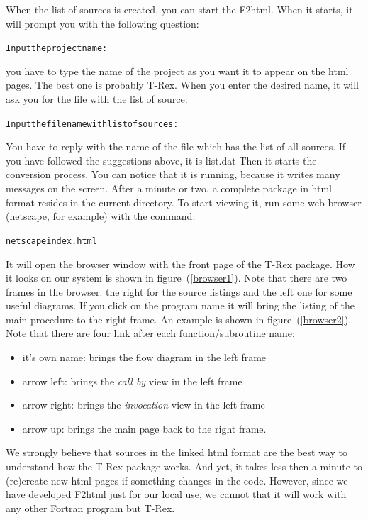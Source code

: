 \documentclass[10pt]{article}
\newcommand*{\tc}{\ttfamily} %
\newcommand*{\tn}{\sffamily} %
\begin{document}
    When the list of sources is created, you can start the
    {\tn F2html}. When it starts, it will prompt you with 
    the following question:
    \small
    \begin{alltt}
    Input the project name:
    \end{alltt}
    \normalsize
    you have to type the name of the project as you want it
    to appear on the html pages. The best one is probably
    {\tc T-Rex}. When you enter the desired name, it will ask
    you for the file with the list of source:
    \small
    \begin{alltt}
    Input the file name with list of sources:
    \end{alltt}
    \normalsize
    You have to reply with the name of the file which has the
    list of all sources. If you have followed the suggestions
    above, it is {\tc list.dat}
    Then it starts the conversion process. You can notice that it
    is running, because it writes many messages on the screen.
    After a minute or two, a complete package in html format
    resides in the current directory. To start viewing it,
    run some web browser (netscape, for example) with the 
    command:
    \small
    \begin{alltt}
    netscape index.html
    \end{alltt}
    \normalsize
    It will open the browser window with the front page of the
    {\tn T-Rex} package. How it looks on our system is shown in
    figure~(\ref{browser1}). Note that there are two frames
    in the browser: the right for the source listings
    and the left one for some useful diagrams.
    If you click on the program name
    it will bring the listing of the main procedure to the
    right frame. An example is shown in figure~(\ref{browser2}).
    Note that there are four link after each function/subroutine
    name:
    \begin{itemize}
    \item it's own name: brings the flow diagram in the left
          frame
    \item arrow left: brings the {\em call by} view in the left
          frame
    \item arrow right: brings the {\em invocation} view in the left
          frame
    \item arrow up: brings the main page back to the right frame.
    \end{itemize}

    We strongly believe that sources in the linked html format
    are the best way to understand how the {\tn T-Rex} package
    works. And yet, it takes less then a minute to (re)create
    new html pages if something changes in the code. However,
    since we have developed {\tn F2html} just for our local use,
    we cannot that it will work with any other Fortran program
    but {\tn T-Rex}. 
\end{document}
